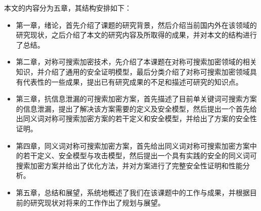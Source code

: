 本文的内容分为五章，其结构安排如下：
\begin{itemize}
  \item
  第一章，绪论，首先介绍了课题的研究背景，然后介绍当前国内外在该领域的研究现状，之后介绍了本文的研究内容及所取得的成果，并对本文的结构进行了总结。

  \item
  第二章，对称可搜索加密技术，先介绍了本课题在对称可搜索加密领域的相关知识，并介绍了通用的安全证明模型，最后分类介绍了对称可搜索加密领域具有代表性的一些成果，提出已有研究成果的不足和描述可研究的知识点。

  \item
  第三章，抗信息泄漏的可搜索加密方案，首先描述了目前单关键词可搜索方案的信息泄漏，提出了解决该方案需要的定义及安全模型，然后提出一个首先给出同义词对称可搜索加密方案的若干定义和安全模型，并给出了方案的安全性证明。

  \item
  第四章，同义词对称可搜索加密方案，首先给出同义词对称可搜索加密方案中的若干定义、安全模型与攻击模型，然后提出一个具有实践的安全的同义词可搜索加密方案并给出了优化方法，并对方案进行了完整安全性证明和性能分析。

  \item
  第五章，总结和展望，系统地概述了我们在该课题中的工作与成果，并根据目前的研究现状对将来的工作作出了规划与展望。

\end{itemize}



